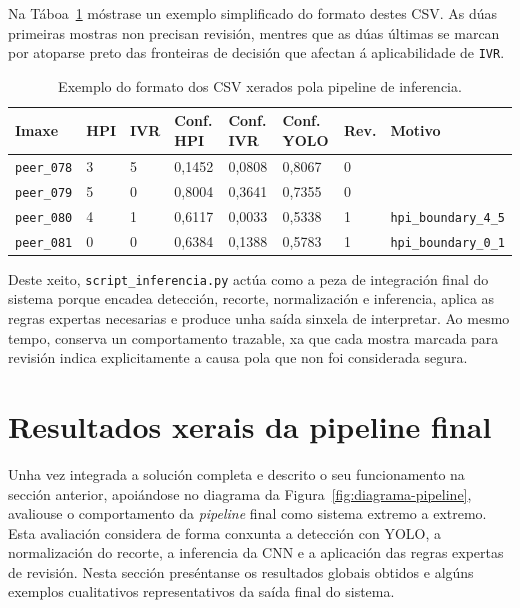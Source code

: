 Na Táboa~\ref{tab:exemplo-csv-pipeline} móstrase un exemplo simplificado do formato destes CSV. As
dúas primeiras mostras non precisan revisión, mentres que as dúas últimas se marcan por atoparse
preto das fronteiras de decisión que afectan á aplicabilidade de \texttt{IVR}.

{
\begin{table}[htbp]
    \centering
    \scriptsize
    \setlength{\tabcolsep}{3pt}
    \begin{tabular}{p{}|p{}|p{}|p{}|p{}|p{}|p{}|p{}}
        \rowcolor{udcpink!25}
        \textbf{Imaxe} & \textbf{HPI} & \textbf{IVR} & \textbf{Conf. HPI} & \textbf{Conf. IVR} & \textbf{Conf. YOLO} & \textbf{Rev.} & \textbf{Motivo} \\\hline
        \texttt{peer\_078} & 3 & 5 & 0,1452 & 0,0808 & 0,8067 & 0 & \\
        \texttt{peer\_079} & 5 & 0 & 0,8004 & 0,3641 & 0,7355 & 0 & \\
        \texttt{peer\_080} & 4 & 1 & 0,6117 & 0,0033 & 0,5338 & 1 & \texttt{hpi\_boundary\_4\_5} \\
        \texttt{peer\_081} & 0 & 0 & 0,6384 & 0,1388 & 0,5783 & 1 & \texttt{hpi\_boundary\_0\_1} \\
    \end{tabular}
    \caption{Exemplo do formato dos CSV xerados pola pipeline de inferencia.}
    \label{tab:exemplo-csv-pipeline}
\end{table}
}

Deste xeito, \texttt{script\_inferencia.py} actúa como a peza de integración final do sistema porque
encadea detección, recorte, normalización e inferencia, aplica as regras expertas necesarias e
produce unha saída sinxela de interpretar. Ao mesmo tempo, conserva un comportamento trazable, xa
que cada mostra marcada para revisión indica explicitamente a causa pola que non foi considerada
segura.

\section{Resultados xerais da pipeline final}

Unha vez integrada a solución completa e descrito o seu funcionamento na sección anterior, apoiándose
no diagrama da Figura~\ref{fig:diagrama-pipeline}, avaliouse o comportamento da \textit{pipeline}
final como sistema extremo a extremo. Esta avaliación considera de forma conxunta a detección con
YOLO, a normalización do recorte, a inferencia da CNN e a aplicación das regras expertas de revisión.
Nesta sección preséntanse os resultados globais obtidos e algúns exemplos cualitativos representativos
da saída final do sistema.

